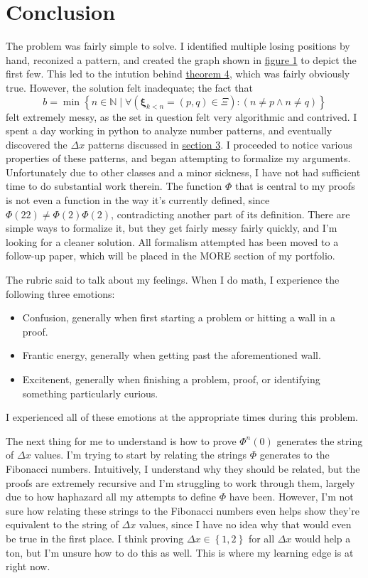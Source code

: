 \documentclass[11pt, letterpaper]{article}
\begin{document}
\section{Conclusion}\label{sec:6}
The problem was fairly simple to solve. I identified multiple losing positions by hand, reconized a pattern, and created the graph shown in \hyperref[fig:1]{figure 1} to depict the first few. This led to the intution behind \hyperref[thm:4]{theorem 4}, which was fairly obviously true. However, the solution felt inadequate; the fact that
\[
	b=\min \left\{ n\in\mathbb{N} \mid \forall \left( \boldsymbol{\xi} _{k<n}=(p,q)\in \Xi  \right) :\left( n\neq p\land n\neq q \right)  \right\} 
\]
felt extremely messy, as the set in question felt very algorithmic and contrived. I spent a day working in python to analyze number patterns, and eventually discovered the $\Delta x$ patterns discussed in \hyperref[sec:3]{section 3}. I proceeded to notice various properties of these patterns, and began attempting to formalize my arguments. Unfortunately due to other classes and a minor sickness, I have not had sufficient time to do substantial work therein. The function $\Phi $ that is central to my proofs is not even a function in the way it's currently defined, since $\Phi (22)\neq \Phi (2)\Phi (2)$, contradicting another part of its definition. There are simple ways to formalize it, but they get fairly messy fairly quickly, and I'm looking for a cleaner solution. All formalism attempted has been moved to a follow-up paper, which will be placed in the MORE section of my portfolio.

The rubric said to talk about my feelings. When I do math, I experience the following three emotions:
\begin{itemize}
	\item Confusion, generally when first starting a problem or hitting a wall in a proof.
	\item Frantic energy, generally when getting past the aforementioned wall.
	\item Excitenent, generally when finishing a problem, proof, or identifying something particularly curious.
\end{itemize}
I experienced all of these emotions at the appropriate times during this problem.

The next thing for me to understand is how to prove $\Phi ^n(0)$ generates the string of $\Delta x$ values. I'm trying to start by relating the strings $\Phi $ generates to the Fibonacci numbers. Intuitively, I understand why they should be related, but the proofs are extremely recursive and I'm struggling to work through them, largely due to how haphazard all my attempts to define $\Phi $ have been. However, I'm not sure how relating these strings to the Fibonacci numbers even helps show they're equivalent to the string of $\Delta x$ values, since I have no idea why that would even be true in the first place. I think proving $\Delta x\in\left\{ 1,2 \right\} $ for all $\Delta x$ would help a ton, but I'm unsure how to do this as well. This is where my learning edge is at right now.
\end{document}
